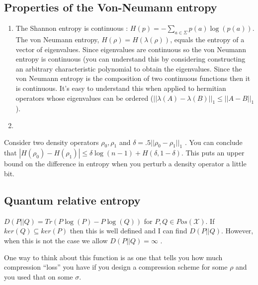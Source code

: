 \documentclass{article}
\begin{document}
\begin{theorem}
    \subsection{Properties of the Von-Neumann entropy}
        \begin{enumerate}
            \item The Shannon entropy is continuous : $H(p) = -
                \sum_{a\in \Sigma} p(a) \log(p(a))$.  The von Neumann
                entropy, $H(\rho) = H(\lambda(\rho))$, equals the entropy
                of a vector of eigenvalues. Since eigenvalues are
                continuous so the von Neumann entropy is continuous (you
                can understand this by considering constructing an
                arbitrary characteristic polynomial to obtain the
                eigenvalues. Since the von Neumann entropy is the
                composition of two continuous functions then it is
                continuous. It's easy to understand this when applied to
                hermitian operators whose eigenvalues can be ordered
                ($||\lambda(A) - \lambda(B)||_1 \le ||A-B||_1$).

            \item

        \end{enumerate}

        \begin{theorem}
            Consider two density operators $ \rho_0,\rho_1 $ and $
            \delta = .5 ||\rho_0 - \rho_1 ||_1 $ . You can conclude that
            $ |H(\rho_0)-H(\rho_1)| \le \delta \log(n-1) +
            H(\delta,1-\delta)$. This puts an upper bound on the
            difference in entropy when you perturb a density operator a
            little bit.
        \end{theorem}
        \subsection{Quantum relative entropy}
        $D(P||Q) = Tr \left(  P\log \left( P \right)-P\log \left( Q
        \right) \right) $ for $ P,Q \in Pos(\mathcal{X}) $. If $ ker(Q)
        \subseteq ker(P) $ then this is well defined and I can find
        $D(P||Q)$. However, when this is not the case we allow $ D(P||Q)
        = \infty $ .

        One way to think about this function is as one that tells you
        how much compression ``loss'' you have if you design a
        compression scheme for some $\rho$ and you used that on some
        $\sigma$.


\end{theorem}
\end{document}
